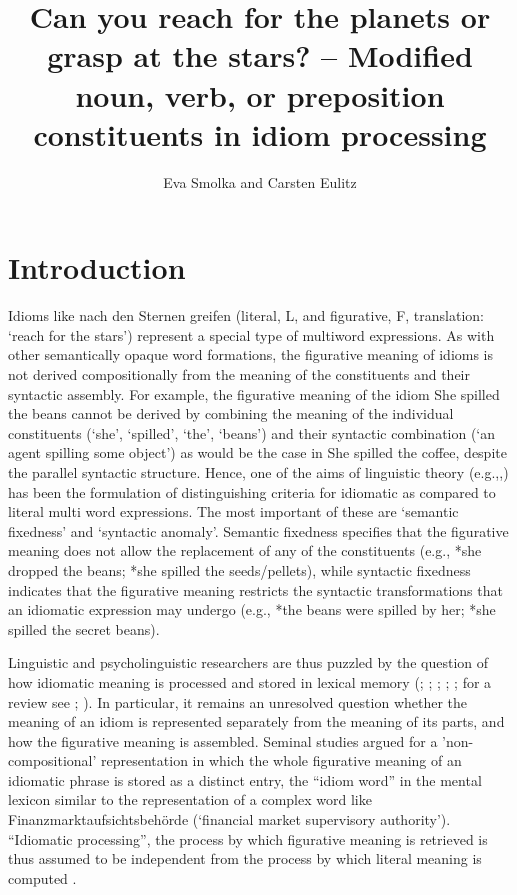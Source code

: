 \documentclass[output=paper]{langsci/langscibook}
\title{Can you reach for the planets or grasp at the stars? – 
Modified noun, verb, or preposition constituents in idiom processing}
\author{%
  Eva Smolka and Carsten Eulitz\affiliation{University of Konstanz, Germany}
}
\begin{document}
\maketitle


\section{Introduction}

Idioms like nach den Sternen greifen (literal, L, and figurative, F, translation: ‘reach for the stars’) represent a special type of multiword expressions. As with other semantically opaque word formations, the figurative meaning of idioms is not derived compositionally from the meaning of the constituents and their syntactic assembly. For example, the figurative meaning of the idiom She spilled the beans cannot be derived by combining the meaning of the individual constituents (‘she’, ‘spilled’, ‘the’, ‘beans’) and their syntactic combination (‘an agent spilling some object’) as would be the case in She spilled the coffee, despite the parallel syntactic structure. Hence, one of the aims of linguistic theory (e.g.,\citet{grice:1975},\citet{grice:1978}) has been the formulation of distinguishing criteria for idiomatic as compared to literal multi word expressions.  The most important of these are ‘semantic fixedness’ and ‘syntactic anomaly’. Semantic fixedness specifies that the figurative meaning does not allow the replacement of any of the constituents (e.g., *she dropped the beans; *she spilled the seeds/pellets), while syntactic fixedness indicates that the figurative meaning restricts the syntactic transformations that an idiomatic expression may undergo (e.g., *the beans were spilled by her; *she spilled the secret beans).

Linguistic and psycholinguistic researchers are thus puzzled by the question of how idiomatic meaning is processed and stored in lexical memory (\citet{burger:2003}\citet{burger:2004}; \citet{cacciari:1994}; \citet{gibbs:2002}; \citet{gibbs:1994}; \citet{swinney:1979}; for a review see \citet{titone:1999}; \citet{titone:2014}). In particular, it remains an unresolved question whether the meaning of an idiom is represented separately from the meaning of its parts, and how the figurative meaning is assembled. Seminal studies argued for a 'non-compositional' representation in which the whole figurative meaning of an idiomatic phrase is stored as a distinct entry, the “idiom word” in the mental lexicon similar to the representation of a complex word like Finanzmarktaufsichtsbehörde (‘financial market supervisory authority’). “Idiomatic processing”, the process by which figurative meaning is retrieved is thus assumed to be independent from the process by which literal meaning is computed \citep{bobrow:1973,gibbs:1980,swinney:1979}. 
\end{document}
